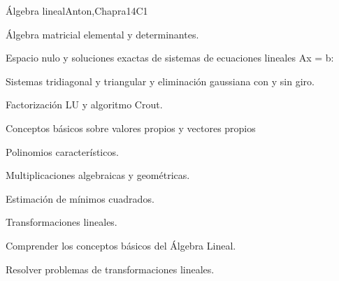 \begin{syllabus}
\begin{unit}{Álgebra lineal}{}{Anton,Chapra}{14}{C1}
   \begin{topics}
    \item Álgebra matricial elemental y determinantes.
    \item Espacio nulo y soluciones exactas de sistemas de ecuaciones lineales Ax = b:
	  \begin{subtopics}
	    \item Sistemas tridiagonal y triangular y eliminación gaussiana con y sin giro.
	    \item Factorización LU y algoritmo Crout.
	  \end{subtopics}
    \item Conceptos básicos sobre valores propios y vectores propios
	  \begin{subtopics}
	    \item Polinomios característicos.
	    \item Multiplicaciones algebraicas y geométricas.
	  \end{subtopics}
    \item Estimación de mínimos cuadrados.
    \item Transformaciones lineales.
    \end{topics}

   \begin{learningoutcomes}
      \item Comprender los conceptos básicos del Álgebra Lineal.
      \item Resolver problemas de transformaciones lineales.
   \end{learningoutcomes}
\end{unit}


\end{syllabus}
